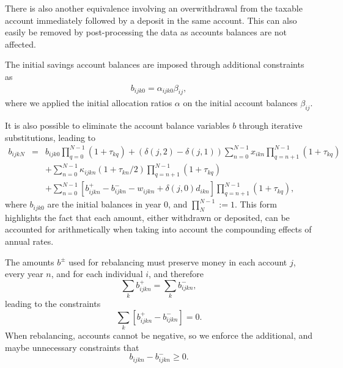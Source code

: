 \documentclass{article}[fleqn,12pt]
\begin{document}
	There is also another equivalence involving an overwithdrawal from the taxable
	account immediately followed by a deposit in the same account. This can also easily
	be removed by post-processing the data as accounts balances are not affected.

	The initial savings account balances are imposed through additional constraints as
	\begin{eqnarray}
		\label{Eq:InitialBalance}
		b_{ijk0} = \alpha_{ijk0}\beta_{ij},
	\end{eqnarray}
	where we applied the initial allocation ratios $\alpha$ on the initial account balances $\beta_{ij}$.

	It is also possible to eliminate the account balance variables $b$ through iterative
	substitutions, leading to
	\begin{eqnarray}
		\label{Eq:C3c}
		b_{ijkN} &=& b_{ijk0}\prod_{q=0}^{N-1} (1 + \tau_{kq})
		+ (\delta(j, 2) - \delta(j, 1)) \sum_{n=0}^{N-1} 
		x_{ikn} \prod_{q=n+1}^{N-1} (1 + \tau_{kq})
		\nonumber \\
		&&+ \sum_{n=0}^{N-1} \kappa_{ijkn}(1 + \tau_{kn}/2)\prod_{q=n+1}^{N-1} (1 + \tau_{kq})
		\nonumber \\
		&& + \sum_{n=0}^{N-1} [ b^+_{ijkn} - b^-_{ijkn} - w_{ijkn} + \delta(j, 0) d_{ikn}]
		\prod_{q=n+1}^{N-1} (1 + \tau_{kq}),
	\end{eqnarray}
	where $b_{ijk0}$ are the initial balances in year 0, and $\prod_{N}^{N-1} := 1$. This form
	highlights the fact that each amount, either withdrawn or deposited, can be accounted
	for arithmetically when taking into account the compounding effects of annual rates.

	The amounts $b^{\pm}$ used for rebalancing must preserve money in each account $j$, every year $n$,
	and for each individual $i$, and therefore
	\begin{equation}
		\sum_k b^+_{ijkn} = \sum _k b^-_{ijkn},
	\end{equation}
	leading to the constraints
	\begin{equation}
		\label{Eq:NoNewMoney}
		\sum_k [b^+_{ijkn} - b^-_{ijkn}] = 0.
	\end{equation}
	When rebalancing, accounts cannot be negative, so we enforce the additional, and maybe
	unnecessary constraints that
	\begin{equation}
		\label{Eq:EnoughMoney}
		b_{ijkn} - b^-_{ijkn} \geq 0.
	\end{equation}
\end{document}
